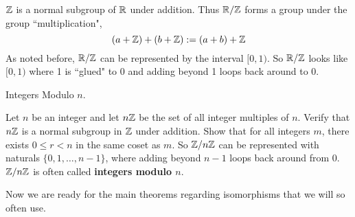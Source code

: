 \documentclass[../../book.tex]{subfiles}
\begin{document}
\begin{eg}
    
    $\mathbb{Z}$ is a normal subgroup of $\mathbb{R}$ under addition. 
    Thus $\mathbb{R} / \mathbb{Z}$ forms a group under the group ``multiplication", \[
        (a + \mathbb{Z}) + (b + \mathbb{Z}) := (a + b) + \mathbb{Z}
    \]
    As noted before, $\mathbb{R} / \mathbb{Z}$ can be represented by the interval $[0,1)$.
    So $\mathbb{R} / \mathbb{Z}$ looks like $[0,1)$ where 1 is ``glued" to 0
    and adding beyond 1 loops back around to 0. 
    
\end{eg}

\begin{ex} Integers Modulo $n$.
    
    Let $n$ be an integer and let $n\mathbb{Z}$ be the set of all integer multiples of $n$.
    Verify that $n\mathbb{Z}$ is a normal subgroup in $\mathbb{Z}$ under addition.
    Show that for all integers $m$,
    there exists $0 \leq r < n$ in the same coset as $m$.
    So $\mathbb{Z} / n\mathbb{Z}$ can be represented with naturals $\{0,1,\dots,n-1\}$,
    where adding beyond $n-1$ loops back around from 0. 
    $\mathbb{Z} / n\mathbb{Z}$ is often called \textbf{integers modulo $n$}.
    
\end{ex}

Now we are ready for the main theorems regarding isomorphisms
that we will so often use. 
\end{document}
